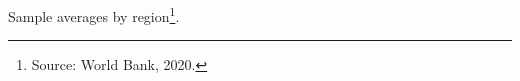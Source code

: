 \documentclass[article]{jss}
\begin{document}
\begin{table}
Sample averages by region\footnote{Source: World Bank, 2020.}.
\caption{Regional summary.}
\end{table}
\end{document}
